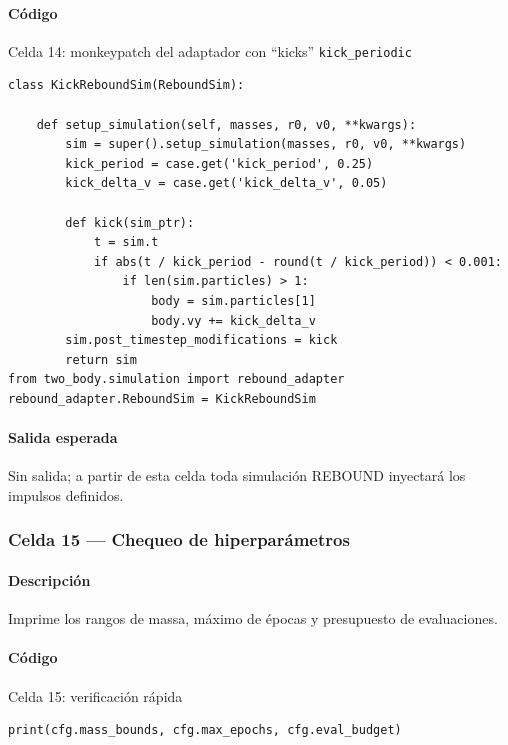 \paragraph{Código}
\par\smallskip
\begin{listing}[H]
\caption{Celda 14: monkeypatch del adaptador con “kicks” \texttt{kick\_periodic}}
\begin{adjustbox}{max width=\textwidth}
\begin{minipage}{\textwidth}
\begin{verbatim}
class KickReboundSim(ReboundSim):

    def setup_simulation(self, masses, r0, v0, **kwargs):
        sim = super().setup_simulation(masses, r0, v0, **kwargs)
        kick_period = case.get('kick_period', 0.25)
        kick_delta_v = case.get('kick_delta_v', 0.05)

        def kick(sim_ptr):
            t = sim.t
            if abs(t / kick_period - round(t / kick_period)) < 0.001:
                if len(sim.particles) > 1:
                    body = sim.particles[1]
                    body.vy += kick_delta_v
        sim.post_timestep_modifications = kick
        return sim
from two_body.simulation import rebound_adapter
rebound_adapter.ReboundSim = KickReboundSim
\end{verbatim}
\end{minipage}
\end{adjustbox}
\end{listing}
\paragraph{Salida esperada} Sin salida; a partir de esta celda toda simulación REBOUND inyectará los impulsos definidos.

\subsubsection*{Celda 15 — Chequeo de hiperparámetros}
\paragraph{Descripción} Imprime los rangos de massa, máximo de épocas y presupuesto de evaluaciones.
\paragraph{Código}
\par\smallskip
\begin{listing}[H]
\caption{Celda 15: verificación rápida}
\begin{adjustbox}{max width=\textwidth}
\begin{minipage}{\textwidth}
\begin{verbatim}
print(cfg.mass_bounds, cfg.max_epochs, cfg.eval_budget)
\end{verbatim}
\end{minipage}
\end{adjustbox}
\end{listing}
